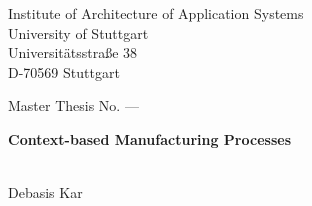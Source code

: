 \documentclass[paper=a4,       %
					 11pt,
					 BCOR0mm,  %
					 DIV10,    %
					 automark, %
					 twoside,
					 halfparskip,
					 bibtotoc,
					 headsepline,
					 normalheadings,
					 appendixprefix,
					 pagesize  %
 ]{scrbook}
\begin{document}
\pagestyle{plain}
\begin{titlepage}
\begin{sffamily}
\begin{center}
Institute of Architecture of Application Systems\\
University of Stuttgart\\
Universitätsstraße 38\\
D-70569 Stuttgart\\
\end{center}

\vspace{3.0cm}

\begin{center}
{Master Thesis No. ---}\\
\vspace{0.5cm}
\begin{minipage}{8.5cm}
\begin{center}
 
  \Large \textbf{Context-based Manufacturing Processes}
 
\end{center}
\end{minipage}
\\
\vspace{1cm}
{Debasis Kar}
\end{center}

\vspace{1.0cm}


\end{sffamily}
\end{titlepage}
\end{document}
